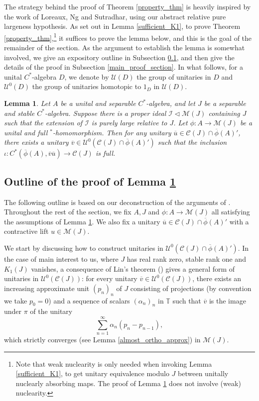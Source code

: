 \documentclass[reqno]{amsart}
\newtheorem{lem}[thm]{Lemma}
\theoremstyle{definition}
\theoremstyle{remark}
\numberwithin{equation}{section}
\theoremstyle{definition}
\newcommand{\calC}{\mathcal{C}}
\newcommand{\calM}{\mathcal{M}}
\newcommand{\calU}{\mathcal{U}}
\newcommand{\calI}{\mathcal{I}}
\begin{document}
The strategy behind the proof of Theorem \ref{property_thm} is heavily inspired by the work of Loreaux, Ng and Sutradhar, using our abstract relative pure largeness hypothesis. As set out in Lemma \ref{sufficient_K1}, to prove Theorem \ref{property_thm},\footnote{Note that weak nuclearity is  only needed when invoking Lemma \ref{sufficient_K1}, to get unitary equivalence modulo $J$ between unitally nuclearly absorbing maps. The proof of Lemma \ref{main} does not involve (weak) nuclearity.} it suffices to prove the lemma below, and this is the goal of the remainder of the section. As the argument to establish the lemma is somewhat involved, we give an expository outline in Subsection \ref{overall_plan_section}, and then give the details of the proof in Subsection \ref{main_proof_section}. In what follows, for a unital $C^*$-algebra $D$, we denote by $\calU(D)$ the group of unitaries in $D$ and $\calU^{0}(D)$ the group of unitaries homotopic to $1_{D}$ in $\calU(D)$. 

\begin{lem}  \label{main} 
Let $A$ be a unital and separable $C^*$-algebra, and let $J$ be a separable and stable $C^*$-algebra. Suppose there is a proper ideal $\mathcal I\lhd \mathcal M(J)$ containing $J$ such that the extension of $\calI$ is purely large relative to $J$. Let $\phi: A\rightarrow \calM(J)$ be a unital and full $^*$-homomorphism. Then for any unitary $\overline{u}\in \calC(J) \cap \overline{\phi}(A)'$, there exists a unitary $\overline{v}\in \calU^{0}(\calC(J) \cap \overline{\phi}(A)')$ such that the inclusion $\iota: C^{*}(\overline{\phi}(A), \overline{v}\overline{u}) \rightarrow \calC(J)$ is full. 
\end{lem} 
 

\subsection{Outline of the proof of Lemma \ref{main}}  
\label{overall_plan_section} 

The following outline is based on our deconstruction of the arguments of \cite{K1-injective}. Throughout the rest of the section, we fix $A, J$ and $\phi\colon A\to\calM(J)$ all satisfying the assumptions of Lemma \ref{main}. We also fix a unitary $\overline{u}\in\calC(J)\cap \overline{\phi}(A)'$ with a contractive lift $u\in\calM(J)$. 

We start by discussing how to construct  unitaries in $\calU^{0} (\calC(J) \cap \overline{\phi}(A)')$. In the case of main interest to us, where $J$ has real rank zero, stable rank one and $K_1(J)$ vanishes, a consequence of Lin's theorem (\cite[Theorem 11]{RR-LHX}) gives a general form of unitaries in $\calU^0(\calC(J))$: for every unitary $\overline{v}\in\calU^{0}(\calC(J))$, there exists an increasing approximate unit $(p_{n})_{n}$ of $J$ consisting of projections (by convention we take $p_0=0$) and a sequence of scalars $(\alpha_{n})_{n}$ in $\mathbb{T}$ such that $\overline{v}$ is the image under $\pi$ of the unitary 
\begin{equation} 
\sum_{n=1}^{\infty} \alpha_{n} (p_{n} - p_{n-1}),
\end{equation} 
which strictly converges (see Lemma \ref{almost_ortho_approx}) in $\calM(J)$.  
\end{document}
